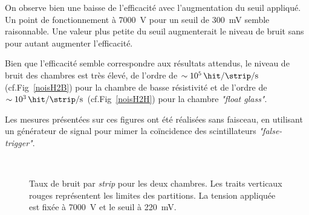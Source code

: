 On observe bien une baisse de l'efficacité avec l'augmentation du seuil appliqué. Un point de fonctionnement à \SI{7000}{\volt} pour un seuil de \SI{300}{\milli\volt} semble raisonnable. Une valeur plus petite du seuil augmenterait le niveau de bruit sans pour autant augmenter l'efficacité.

Bien que l'efficacité semble correspondre aux résultats attendus, le niveau de bruit des chambres est très élevé, de l'ordre de $\sim\SI{e5}{\hit\per\strip\per\second}$ (cf.Fig~\ref{noisH2B}) pour la chambre de basse résistivité et de l'ordre de $\sim\SI{e3}{\hit\per\strip\per\second}$ (cf.Fig~\ref{noisH2H}) pour la chambre \textit{"float glass"}. 

Les mesures présentées sur ces figures ont été réalisées sans faisceau, en utilisant un générateur de signal pour mimer la coïncidence des scintillateurs \textit{"false-trigger"}.
\vspace*{0.4cm}
\begin{figure}[ht!]
	\centering
	\\
	\vspace*{1.3cm}
	\caption{Taux de bruit par \textit{strip} pour les deux chambres. Les traits verticaux rouges représentent les limites des partitions. La tension appliquée est fixée à \SI{7000}{\volt} et le seuil à \SI{220}{\milli\volt}.}
\end{figure}

